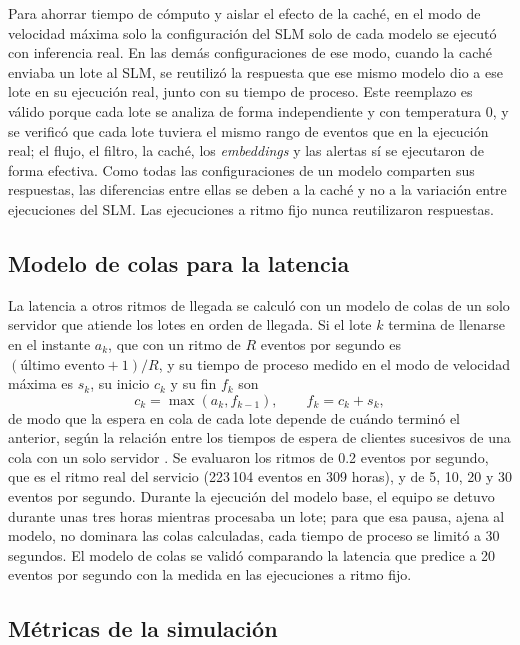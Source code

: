Para ahorrar tiempo de cómputo y aislar el efecto de la caché, en el modo de velocidad máxima solo la configuración del SLM solo de cada modelo se ejecutó con inferencia real. En las demás configuraciones de ese modo, cuando la caché enviaba un lote al SLM, se reutilizó la respuesta que ese mismo modelo dio a ese lote en su ejecución real, junto con su tiempo de proceso. Este reemplazo es válido porque cada lote se analiza de forma independiente y con temperatura 0, y se verificó que cada lote tuviera el mismo rango de eventos que en la ejecución real; el flujo, el filtro, la caché, los \textit{embeddings} y las alertas sí se ejecutaron de forma efectiva. Como todas las configuraciones de un modelo comparten sus respuestas, las diferencias entre ellas se deben a la caché y no a la variación entre ejecuciones del SLM. Las ejecuciones a ritmo fijo nunca reutilizaron respuestas.

\subsection{Modelo de colas para la latencia}

La latencia a otros ritmos de llegada se calculó con un modelo de colas de un solo servidor que atiende los lotes en orden de llegada. Si el lote $k$ termina de llenarse en el instante $a_k$, que con un ritmo de $R$ eventos por segundo es $(\text{último evento} + 1)/R$, y su tiempo de proceso medido en el modo de velocidad máxima es $s_k$, su inicio $c_k$ y su fin $f_k$ son
\begin{equation}
c_k = \max(a_k, f_{k-1}), \qquad f_k = c_k + s_k,
\end{equation}
de modo que la espera en cola de cada lote depende de cuándo terminó el anterior, según la relación entre los tiempos de espera de clientes sucesivos de una cola con un solo servidor \cite{lindley1952_queues}. Se evaluaron los ritmos de 0.2 eventos por segundo, que es el ritmo real del servicio (223\,104 eventos en 309 horas), y de 5, 10, 20 y 30 eventos por segundo. Durante la ejecución del modelo base, el equipo se detuvo durante unas tres horas mientras procesaba un lote; para que esa pausa, ajena al modelo, no dominara las colas calculadas, cada tiempo de proceso se limitó a 30 segundos. El modelo de colas se validó comparando la latencia que predice a 20 eventos por segundo con la medida en las ejecuciones a ritmo fijo.

\subsection{Métricas de la simulación}

